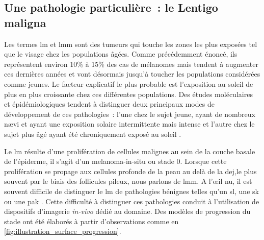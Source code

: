 \subsection{Une pathologie particulière~: le Lentigo maligna}
\label{subsec:lentigo}
Les termes \acrfull{lm} et \acrfull{lmm} sont des tumeurs qui touche les zones les plus exposées tel que le visage chez les populations âgées. Comme précédemment énoncé, ils représentent environ 10\% à 15\% des cas de mélanomes mais tendent à augmenter ces dernières années et vont désormais jusqu'à toucher les populations considérées comme jeunes. Le facteur explicatif le plus probable est l'exposition au soleil de plus en plus croissante chez ces différentes populations. Des études moléculaires et épidémiologiques tendent à distinguer deux principaux modes de développement de ces pathologies~: l'une chez le sujet jeune, ayant de nombreux nævi et ayant une exposition solaire intermittente mais intense et l'autre chez le sujet plus âgé ayant été chroniquement exposé au soleil \cite{Baccard2009, LeGal2011, LeDuff2014}.\par

Le \gls{lm} résulte d'une prolifération de cellules malignes au sein de la couche basale de l'épiderme, il s'agit d'un melanoma-in-situ ou stade 0. Lorsque cette prolifération se propage aux cellules profonde de la peau au delà de la \gls{dej},le plus souvent par le biais des follicules pileux, nous parlons de \gls{lmm}. A l’œil nu, il est souvent difficile de distinguer le \gls{lm} de pathologies bénignes telles qu'un \gls{sl}, une \gls{sk} ou une \gls{pak} \cite{LeGal2011, LeDuff2014}. Cette difficulté à distinguer ces pathologies conduit à l'utilisation de dispositifs d'imagerie \textit{in-vivo} dédié au domaine. Des modèles de progression du stade ont été élaborés à partir d'observations comme en \cref{fig:illustration_surface_progression}.\par

